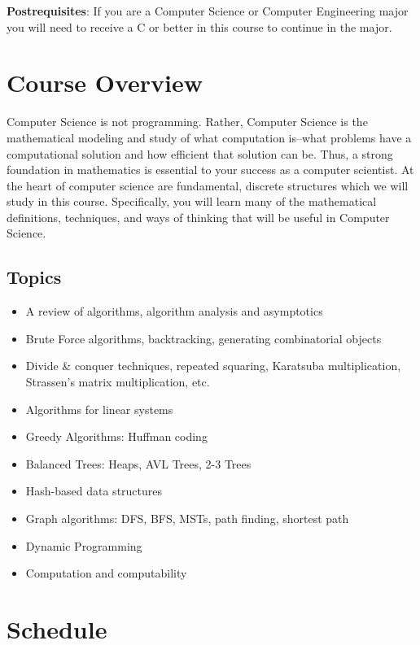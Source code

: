 \documentclass[12pt]{scrartcl}
\begin{document}
\textbf{Postrequisites}: If you are a Computer Science or Computer 
Engineering major you will need to receive a C or better in this course 
to continue in the major.  

\section{Course Overview}

Computer Science is not programming. Rather, Computer Science is the 
mathematical modeling and study of what computation is--what 
problems have a computational solution and how efficient that solution 
can be. Thus, a strong foundation in mathematics is essential to your 
success as a computer scientist.  At the heart of computer science 
are fundamental, discrete structures which we will study in this 
course.  Specifically, you will learn many of the mathematical 
definitions, techniques, and ways of thinking that will be useful 
in Computer Science.

\subsection{Topics}

\begin{itemize}
  \item A review of algorithms, algorithm analysis and asymptotics
  \item Brute Force algorithms, backtracking, generating combinatorial objects
  \item Divide \& conquer techniques, repeated squaring, Karatsuba multiplication, Strassen's matrix multiplication, etc.
  \item Algorithms for linear systems
  \item Greedy Algorithms: Huffman coding
  \item Balanced Trees: Heaps, AVL Trees, 2-3 Trees
  \item Hash-based data structures
  \item Graph algorithms: DFS, BFS, MSTs, path finding, shortest path
  \item Dynamic Programming
  \item Computation and computability
\end{itemize}

\section{Schedule}
\end{document}
